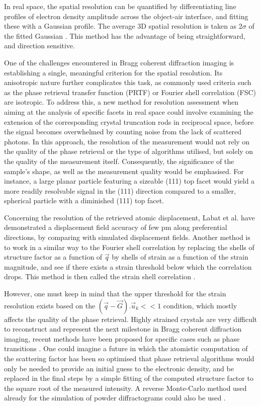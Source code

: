 In real space, the spatial resolution can be quantified by differentiating line profiles of electron density amplitude across the object-air interface, and fitting these with a Gaussian profile.
The average 3D spatial resolution is taken as 2$\sigma$ of the fitted Gaussian \parencite{Hofmann2020}.
This method has the advantage of being straightforward, and direction sensitive.

One of the challenges encountered in Bragg coherent diffraction imaging is establishing a single, meaningful criterion for the spatial resolution.
Its anisotropic nature further complicates this task, as commonly used criteria such as the phase retrieval transfer function (PRTF) or Fourier shell correlation (FSC) are isotropic.
To address this, a new method for resolution assessment when aiming at the analysis of specific facets in real space could involve examining the extension of the corresponding crystal truncation rods in reciprocal space, before the signal becomes overwhelmed by counting noise from the lack of scattered photons.
In this approach, the resolution of the measurement would not rely on the quality of the phase retrieval or the type of algorithms utilised, but solely on the quality of the measurement itself.
Consequently, the significance of the sample's shape, as well as the measurement quality would be emphasised.
For instance, a large planar particle featuring a sizeable (111) top facet would yield a more readily resolvable signal in the (111) direction compared to a smaller, spherical particle with a diminished (111) top facet.

Concerning the resolution of the retrieved atomic displacement, Labat et al. \parencite*{Labat2015} have demonstrated a displacement field accuracy of few \unit{pm} along preferential directions, by comparing with simulated displacement fields.
Another method is to work in a similar way to the Fourier shell correlation by replacing the shells of structure factor as a function of $\vec{q}$ by shells of strain as a function of the strain magnitude, and see if there exists a strain threshold below which the correlation drops.
This method is then called the strain shell correlation \parencite{Girard2020}.

However, one must keep in mind that the upper threshold for the strain resolution exists based on the $(\vec{q}-\vec{G}).\vec{u}_k<<1$ condition, which mostly affects the quality of the phase retrieval.
Highly strained crystals are very difficult to reconstruct and represent the next milestone in Bragg coherent diffraction imaging, recent methods have been proposed for specific cases such as phase transitions \parencite{Wang2020}.
One could imagine a future in which the atomistic computation of the scattering factor has been so optimised that phase retrieval algorithms would only be needed to provide an initial guess to the electronic density, and be replaced in the final steps by a simple fitting of the computed structure factor to the square root of the measured intensity.
A reverse Monte-Carlo method used already for the simulation of powder diffractograms could also be used \parencite{RLMcGreevy2001}.

